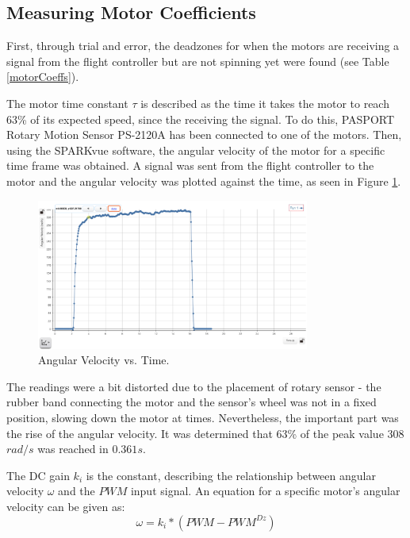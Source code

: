 \subsection{Measuring Motor Coefficients}
First, through trial and error, the deadzones for when the motors are receiving a signal from the flight controller but are not spinning yet were found (see Table \ref{motorCoeffs}).

The motor time constant $\tau$ is described as the time it takes the motor to reach 63\% of its expected speed, since the receiving the signal. To do this, PASPORT Rotary Motion Sensor PS-2120A has been connected to one of the motors. Then, using the SPARKvue software, the angular velocity of the motor for a specific time frame was obtained. A signal was sent from the flight controller to the motor and the angular velocity was plotted against the time, as seen in Figure \ref{timeconstant}.

\begin{figure}[H]
  \centering
    \includegraphics[width=0.8\textwidth]{images/timeconstant.png}
	\caption{Angular Velocity vs. Time.}
	\label{timeconstant}
\end{figure}

The readings were a bit distorted due to the placement of rotary sensor - the rubber band connecting the motor and the sensor's wheel was not in a fixed position, slowing down the motor at times. Nevertheless, the important part was the rise of the angular velocity. It was determined that 63\% of the peak value 308$rad/s$ was reached in $0.361s$.

The DC gain $k_i$ is the constant, describing the relationship between angular velocity $\omega$ and the $PWM$ input signal. An equation for a specific motor's angular velocity can be given as:
\begin{equation}
\label{kieq}
	\omega = k_i*(PWM - PWM^{Dz})
\end{equation}

